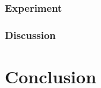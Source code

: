 \documentclass{article}
\begin{document}
\subsubsection{Experiment}

\subsubsection{Discussion}

\section{Conclusion}


\end{document}
